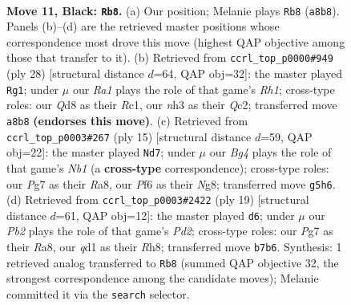 \documentclass[11pt]{article}
\begin{document}
\clearpage

\begin{figure}[p]\centering
\begin{subfigure}{0.46\textwidth}\centering
\resizebox{\linewidth}{!}{%
\newchessgame
\chessboard[
  setfen={r1bqk2r/pp1n2pp/2p2p2/3p2b1/3P4/2N1P2N/PP2BPPP/R2QK2R b KQkq - 1 11},
  showmover=false,
  pgfstyle=straightmove, color=movearrow, markmove={a8-b8}
]}
\caption{}
\end{subfigure}\hfill
\begin{subfigure}{0.46\textwidth}\centering
\resizebox{\linewidth}{!}{%
\newchessgame
\chessboard[
  setfen={r2qkb1r/1p3pp1/p1n1pn1p/3p4/N2P4/P3PP2/1PQB1P1P/2R1KB1R w Kkq - 2 15},
  showmover=false,
  pgfstyle=straightmove, color=movearrow, markmove={h1-g1}
]}
\caption{}
\end{subfigure}
\\[4pt]
\begin{subfigure}{0.46\textwidth}\centering
\resizebox{\linewidth}{!}{%
\newchessgame
\chessboard[
  setfen={rn1qk1nr/pp2bppp/2p1b3/3p4/3P1BPP/2N1P3/PP3P2/R2QKBNR b KQkq - 0 8},
  showmover=false,
  pgfstyle=straightmove, color=movearrow, markmove={b8-d7}
]}
\caption{}
\end{subfigure}\hfill
\begin{subfigure}{0.46\textwidth}\centering
\resizebox{\linewidth}{!}{%
\newchessgame
\chessboard[
  setfen={r3k1nr/1bqpbppp/p1n1p3/1p6/4PP2/PNN1B3/1PP1B1PP/R2QK2R b KQkq - 2 10},
  showmover=false,
  pgfstyle=straightmove, color=movearrow, markmove={d7-d6}
]}
\caption{}
\end{subfigure}
\caption{\textbf{Move 11, Black: \texttt{Rb8}.} (a) Our position; Melanie plays \texttt{Rb8} (\texttt{a8b8}). Panels (b)--(d) are the retrieved master positions whose correspondence most drove this move (highest QAP objective among those that transfer to it). (b) Retrieved from \texttt{ccrl\_top\_p0000\#949} (ply 28) [structural distance $d$=64, QAP obj=32]: the master played \texttt{Rg1}; under $\mu$ our \emph{Ra1} plays the role of that game's \emph{Rh1}; cross-type roles: our \emph{Q}d8 as their \emph{R}c1, our \emph{n}h3 as their \emph{Q}c2; transferred move \texttt{a8b8} \textbf{(endorses this move)}. (c) Retrieved from \texttt{ccrl\_top\_p0003\#267} (ply 15) [structural distance $d$=59, QAP obj=22]: the master played \texttt{Nd7}; under $\mu$ our \emph{Bg4} plays the role of that game's \emph{Nb1} (a \textbf{cross-type} correspondence); cross-type roles: our \emph{P}g7 as their \emph{R}a8, our \emph{P}f6 as their \emph{N}g8; transferred move \texttt{g5h6}. (d) Retrieved from \texttt{ccrl\_top\_p0003\#2422} (ply 19) [structural distance $d$=61, QAP obj=12]: the master played \texttt{d6}; under $\mu$ our \emph{Pb2} plays the role of that game's \emph{Pd2}; cross-type roles: our \emph{P}g7 as their \emph{R}a8, our \emph{q}d1 as their \emph{R}h8; transferred move \texttt{b7b6}. Synthesis: 1 retrieved analog transferred to \texttt{Rb8} (summed QAP objective 32, the strongest correspondence among the candidate moves); Melanie committed it via the \texttt{search} selector.}
\label{fig:thought-m21}
\end{figure}
\end{document}
